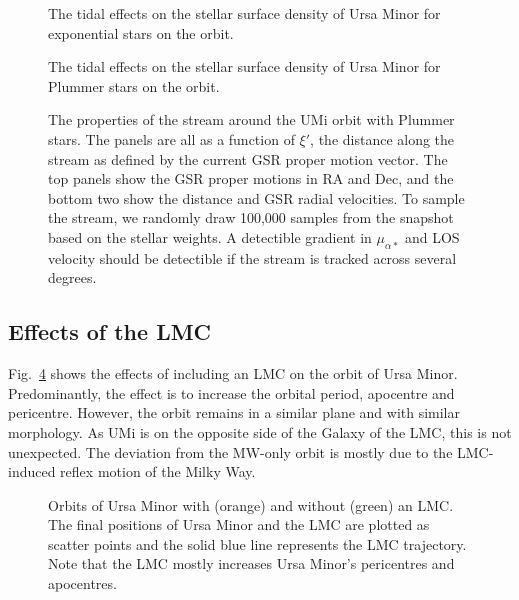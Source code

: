 \begin{figure}
\centering
{}
\caption[Ursa Minor simulated density profiles]{The tidal effects on the
stellar surface density of Ursa Minor for exponential stars on the
\smallperi{} orbit.}\label{fig:umi_smallperi_i_f}
\end{figure}

\begin{figure}
\centering
{}
\caption[Ursa Minor simulated density profiles]{The tidal effects on the
stellar surface density of Ursa Minor for Plummer stars on the
\smallperi{} orbit.}\label{fig:umi_plummer_i_f}
\end{figure}

\begin{figure}
\centering
{}
\caption[Ursa Minor Predicted stream]{The properties of the stream
around the UMi \smallperi{} orbit with Plummer stars. The panels are all
as a function of \(\xi'\), the distance along the stream as defined by
the current GSR proper motion vector. The top panels show the GSR proper
motions in RA and Dec, and the bottom two show the distance and GSR
radial velocities. To sample the stream, we randomly draw 100,000
samples from the snapshot based on the stellar weights. A detectible
gradient in \(\mu_{\alpha*}\) and LOS velocity should be detectible if
the stream is tracked across several
degrees.}\label{fig:umi_tidal_stream}
\end{figure}

\subsection{Effects of the LMC}\label{effects-of-the-lmc}

Fig.~\ref{fig:umi_orbits_lmc} shows the effects of including an LMC on
the orbit of Ursa Minor. Predominantly, the effect is to increase the
orbital period, apocentre and pericentre. However, the orbit remains in
a similar plane and with similar morphology. As UMi is on the opposite
side of the Galaxy of the LMC, this is not unexpected. The deviation
from the MW-only orbit is mostly due to the LMC-induced reflex motion of
the Milky Way.

\begin{figure}
\centering
{}
\caption[Ursa Minor orbits with LMC]{Orbits of Ursa Minor with (orange)
and without (green) an LMC. The final positions of Ursa Minor and the
LMC are plotted as scatter points and the solid blue line represents the
LMC trajectory. Note that the LMC mostly increases Ursa Minor's
pericentres and apocentres.}\label{fig:umi_orbits_lmc}
\end{figure}

